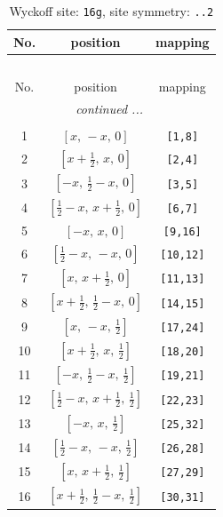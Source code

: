 \documentclass[fleqn,8pt]{jsarticle}
\begin{document}
\begin{longtable}{ccc}
\caption{Wyckoff site: {\tt 16g}, site symmetry: {\tt ..2}}
 \\
 \hline \hline
No. & position & mapping \\ \hline \endfirsthead

\multicolumn{2}{l}{\tablename\ \thetable{}} \\
 \hline \hline
No. & position & mapping \\ \hline \endhead

 \hline \hline
\multicolumn{2}{r}{\footnotesize\it continued ...} \\ \endfoot

 \hline \hline
\multicolumn{2}{r}{} \\ \endlastfoot

1 & $\left[ x,\, - x,\, 0 \right]$ & {\tt [1,8]} \\ \hline
2 & $\left[ x + \frac{1}{2},\, x,\, 0 \right]$ & {\tt [2,4]} \\ \hline
3 & $\left[ - x,\, \frac{1}{2} - x,\, 0 \right]$ & {\tt [3,5]} \\ \hline
4 & $\left[ \frac{1}{2} - x,\, x + \frac{1}{2},\, 0 \right]$ & {\tt [6,7]} \\ \hline
5 & $\left[ - x,\, x,\, 0 \right]$ & {\tt [9,16]} \\ \hline
6 & $\left[ \frac{1}{2} - x,\, - x,\, 0 \right]$ & {\tt [10,12]} \\ \hline
7 & $\left[ x,\, x + \frac{1}{2},\, 0 \right]$ & {\tt [11,13]} \\ \hline
8 & $\left[ x + \frac{1}{2},\, \frac{1}{2} - x,\, 0 \right]$ & {\tt [14,15]} \\ \hline
9 & $\left[ x,\, - x,\, \frac{1}{2} \right]$ & {\tt [17,24]} \\ \hline
10 & $\left[ x + \frac{1}{2},\, x,\, \frac{1}{2} \right]$ & {\tt [18,20]} \\ \hline
11 & $\left[ - x,\, \frac{1}{2} - x,\, \frac{1}{2} \right]$ & {\tt [19,21]} \\ \hline
12 & $\left[ \frac{1}{2} - x,\, x + \frac{1}{2},\, \frac{1}{2} \right]$ & {\tt [22,23]} \\ \hline
13 & $\left[ - x,\, x,\, \frac{1}{2} \right]$ & {\tt [25,32]} \\ \hline
14 & $\left[ \frac{1}{2} - x,\, - x,\, \frac{1}{2} \right]$ & {\tt [26,28]} \\ \hline
15 & $\left[ x,\, x + \frac{1}{2},\, \frac{1}{2} \right]$ & {\tt [27,29]} \\ \hline
16 & $\left[ x + \frac{1}{2},\, \frac{1}{2} - x,\, \frac{1}{2} \right]$ & {\tt [30,31]} \\
\end{longtable}
\end{document}
